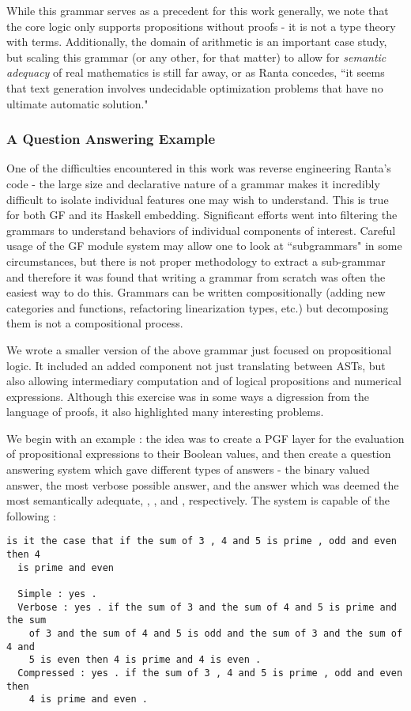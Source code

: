 While this grammar serves as a precedent for this work generally, we note that
the core logic only supports propositions without proofs - it is not a type
theory with terms. Additionally, the domain of arithmetic is an important case
study, but scaling this grammar (or any other, for that matter) to allow for
\emph{semantic adequacy} of real mathematics is still far away, or as Ranta
concedes, ``it seems that text generation involves undecidable optimization
problems that have no ultimate automatic solution."

\subsubsection{A Question Answering Example}

One of the difficulties encountered in this work was reverse engineering Ranta's
code - the large size and declarative nature of a grammar makes it incredibly
difficult to isolate individual features one may wish to understand. This is
true for both GF and its Haskell embedding. Significant efforts went into
filtering the grammars to understand behaviors of individual components of
interest. Careful usage of the GF module system may allow one to look at
``subgrammars" in some circumstances, but there is not proper methodology to
extract a sub-grammar and therefore it was found that writing a grammar from
scratch was often the easiest way to do this. Grammars can be written
compositionally (adding new categories and functions, refactoring linearization
types, etc.) but decomposing them is not a compositional process.

We wrote a smaller version of the above grammar \cite{warrickCub} just focused on
propositional logic. It included an added component not just translating between
ASTs, but also allowing intermediary computation and of logical
propositions and numerical expressions. Although this exercise was in some ways
a digression from the language of proofs, it also highlighted many interesting
problems.

We begin with an example : the idea was to create a PGF layer for the evaluation
of propositional expressions to their Boolean values, and then create a question
answering system which gave different types of answers - the binary valued
answer, the most verbose possible answer, and the answer which was deemed the
most semantically adequate, , , and
, respectively. The system is capable of the following :
\begin{verbatim}
is it the case that if the sum of 3 , 4 and 5 is prime , odd and even then 4
  is prime and even

  Simple : yes .
  Verbose : yes . if the sum of 3 and the sum of 4 and 5 is prime and the sum
    of 3 and the sum of 4 and 5 is odd and the sum of 3 and the sum of 4 and
    5 is even then 4 is prime and 4 is even .
  Compressed : yes . if the sum of 3 , 4 and 5 is prime , odd and even then
    4 is prime and even .
\end{verbatim}

